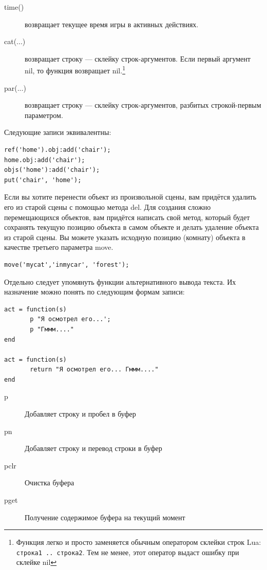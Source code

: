 \documentclass[a4paper,12pt]{article}
\begin{document}
\begin{description}
\item[time()]  возвращает текущее время игры в активных действиях.
\item[cat(...)]  возвращает строку --- склейку строк-аргументов. Если первый аргумент nil, то функция возвращает nil.\footnote{Функция легко и просто заменяется обычным оператором склейки строк Lua: \texttt{строка1 .. строка2}. Тем не менее, этот оператор выдаст ошибку при склейке nil}
\item[par(...)]  возвращает строку --- склейку строк-аргументов, разбитых строкой-первым параметром.
\end{description}

Следующие записи эквивалентны:

\begin{verbatim}
ref('home').obj:add('chair');
home.obj:add('chair');
objs('home'):add('chair');
put('chair', 'home');
\end{verbatim}

Если вы хотите перенести объект из произвольной сцены, вам придётся удалить его из старой сцены с помощью метода del. Для создания сложно перемещающихся объектов, вам придётся написать свой метод, который будет сохранять текущую позицию объекта в самом объекте и делать удаление объекта из старой сцены. Вы можете указать исходную позицию (комнату) объекта в качестве третьего параметра move.

\begin{verbatim}
move('mycat','inmycar', 'forest');
\end{verbatim}

Отдельно следует упомянуть функции альтернативного вывода текста. Их назначение можно понять по следующим формам записи:

\begin{verbatim}
act = function(s)
       p "Я осмотрел его...';
       p "Гммм...."
end

act = function(s)
       return "Я осмотрел его... Гммм...."
end
\end{verbatim}

\begin{description}
\item[p]  Добавляет строку и пробел в буфер
\item[pn]  Добавляет строку и перевод строки в буфер
\item[pclr]  Очистка буфера
\item[pget]  Получение содержимое буфера на текущий момент
\end{description}
\end{document}

